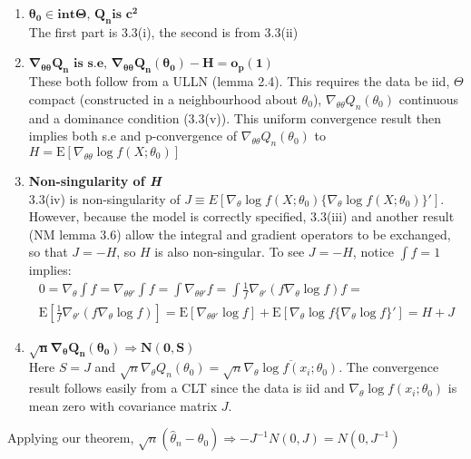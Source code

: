 \documentclass[11pt,letterpaper]{article}                  %
\begin{document}
\begin{problem}
\begin{enumerate}
\item $\mathbf{\theta_0 \in \textbf{int}\Theta\textbf{, }Q_n \textbf{
      is }c^2}$ \\
The first part is 3.3(i), the second is from 3.3(ii) 

\item $\mathbf{\nabla_{\theta\theta} Q_n \textbf{ is s.e, }
    \nabla_{\theta\theta} Q_n(\theta_0) - H = o_p(1)}$ \\
These both follow from a ULLN (lemma 2.4). This requires
the data be iid, $\Theta$ compact (constructed in a neighbourhood
about $\theta_0$), $\nabla_{\theta\theta}
Q_n(\theta_0)$ continuous and a dominance condition (3.3(v)). This
uniform convergence result then implies both s.e and p-convergence of $\nabla_{\theta\theta} Q_n(\theta_0)$ to $H =
\mathrm{E}[\nabla_{\theta\theta} \log f(X;\theta_0)]$

\item \textbf{Non-singularity of \textit{H}} \\
3.3(iv) is non-singularity of $J \equiv E[\nabla_{\theta} \log
f(X;\theta_0) \{\nabla_{\theta} \log f(X;\theta_0)\}']$. However,
because the model is correctly specified, 3.3(iii)
and another result (NM lemma 3.6) allow the integral and gradient
operators to be exchanged, so that $J = -H$, so $H$ is also
non-singular. To see $J = -H$, notice $\int f = 1$ implies:
\begin{multline*}
  0 = \nabla_{\theta} \int f =
  \nabla_{\theta\theta'} \int f = \int  \nabla_{\theta \theta'}  f = \int
  \tfrac{1}{f} \nabla_{\theta'} (f \nabla_{\theta} \log f) f = \\
  \mathrm{E} [\tfrac{1}{f} \nabla_{\theta'} (f \nabla_{\theta} \log
  f)] = \mathrm{E}[\nabla_{\theta\theta'}\log f] +
  \mathrm{E}[\nabla_{\theta} \log f \{\nabla_{\theta} \log f\}'] = H + J
\end{multline*}

\item $\mathbf{\sqrt{n}\nabla_{\theta}Q_n(\theta_0) \Rightarrow
    N(0,S)}$ \\
  Here $S= J$ and
  $\sqrt{n}\nabla_{\theta}Q_n(\theta_0) = \sqrt{n}
  \overline{\nabla_{\theta}\log f(x_i; \theta_0)}$. The convergence
  result follows
  easily from a CLT since the data is iid and
  $\nabla_{\theta}\log f(x_i; \theta_0)$ is mean zero with covariance
  matrix $J$.
\end{enumerate}
Applying our theorem, $\sqrt{n}(\hat{\theta}_n - \theta_0) \Rightarrow
-J^{-1} N(0, J) = N(0, J^{-1})$ \\

\end{problem}
\end{document}
